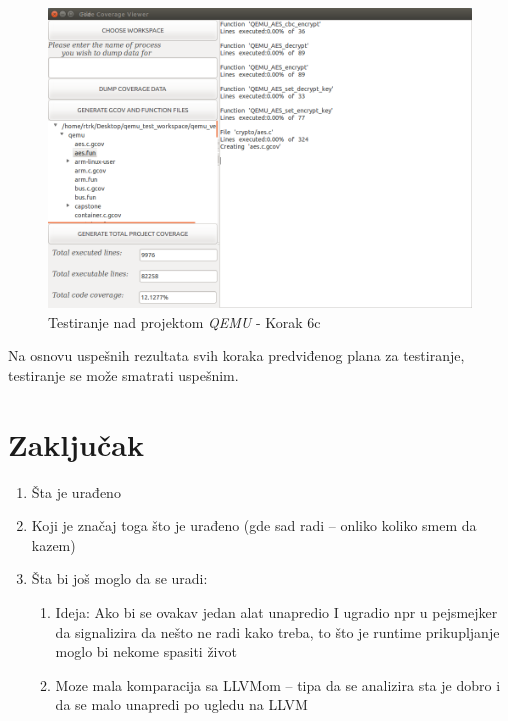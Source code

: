 \documentclass[12pt,oneside]{memoir}
\newcommand{\strano}[1]{\textit{#1}}
\begin{document}
\begin{figure}[!ht]
  \centering
  \includegraphics[width=\textwidth]{img/qemu-test-6c-ng.png}
  \caption{Testiranje nad projektom \strano{QEMU} - Korak 6c}
  \label{fig:qemu-test-6c}
\end{figure} 

Na osnovu uspešnih rezultata svih koraka predviđenog plana za testiranje, testiranje se može smatrati uspešnim.


\chapter{Zaključak}


\begin{enumerate}
\item Šta je urađeno
\item Koji je značaj toga što je urađeno (gde sad radi – onliko koliko smem da kazem)
\item Šta bi još moglo da se uradi:
\begin{enumerate}
\item Ideja: Ako bi se ovakav jedan alat unapredio I ugradio npr u pejsmejker da signalizira da nešto ne radi kako treba, to što je runtime prikupljanje moglo bi nekome spasiti život
\item Moze mala komparacija sa LLVMom – tipa da se analizira sta je dobro i da se malo unapredi po ugledu na LLVM
\end{enumerate}
\end{enumerate}
\end{document}
